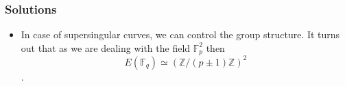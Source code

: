 \documentclass{beamer}
\begin{document}
\begin{frame}
\frametitle{Solutions}

	\begin{itemize}
		\item In case of \alert{supersingular} curves, we can control the group structure. It turns out that as we are dealing with the field $\mathbb{F}_p^2$ then
			\[ E(\mathbb{F}_q) \simeq (\mathbb{Z}/(p \pm 1)\mathbb{Z})^2 \].
	\end{itemize}
\end{frame}
\end{document}
